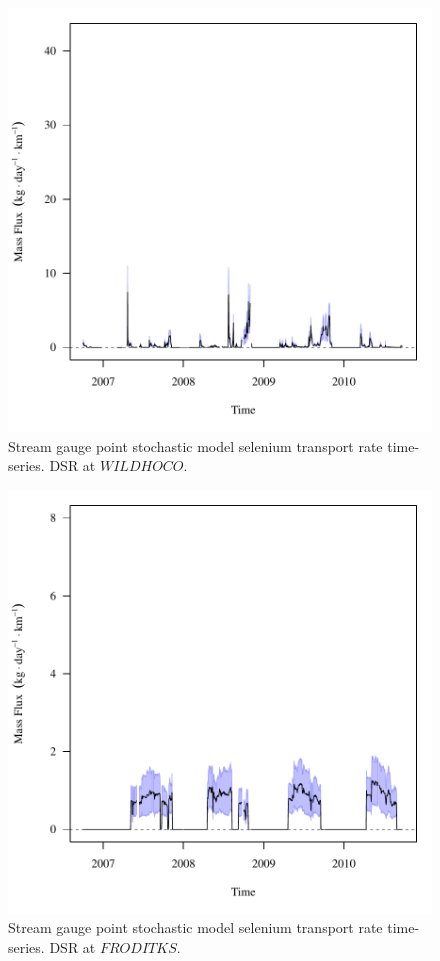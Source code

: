 \begin{figure}[htbp]
	\begin{center}
	\includegraphics[width=6in]{"Figures/Results_DSR/f WIL"}
	\caption{Stream gauge point stochastic model selenium transport rate time-series.  DSR at $WILDHOCO$.}
	\end{center}
\end{figure}
\newpage

\begin{figure}[htbp]
	\begin{center}
	\includegraphics[width=6in]{"Figures/Results_DSR/f FRO"}
	\caption{Stream gauge point stochastic model selenium transport rate time-series.  DSR at $FRODITKS$.}
	\end{center}
\end{figure}
\newpage

